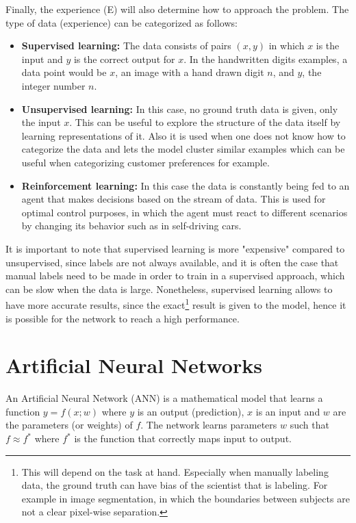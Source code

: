 Finally, the experience (E) will also determine how to approach the problem. The type of data (experience) can be categorized as follows:
\begin{itemize}
    \item \textbf{Supervised learning:} The data consists of pairs $(x,y)$ in which $x$ is the input and $y$ is the correct output for $x$. In the handwritten digits examples, a data point would be $x$, an image with a hand drawn digit $n$, and $y$, the integer number $n$.
    \item \textbf{Unsupervised learning:} In this case, no ground truth data is given, only the input $x$. This can be useful to explore the structure of the data itself by learning representations of it. Also it is used when one does not know how to categorize the data and lets the model cluster similar examples which can be useful when categorizing customer preferences for example.
    \item \textbf{Reinforcement learning:} In this case the data is constantly being fed to an agent that makes decisions based on the stream of data. This is used for optimal control purposes, in which the agent must react to different scenarios by changing its behavior such as in self-driving cars.
\end{itemize}

It is important to note that supervised learning is more "expensive" compared to unsupervised, since labels are not always available, and it is often the case that manual labels need to be made in order to train in a supervised approach, which can be slow when the data is large. Nonetheless, supervised learning allows to have more accurate results, since the exact\footnote{This will depend on the task at hand. Especially when manually labeling data, the ground truth can have bias of the scientist that is labeling. For example in image segmentation, in which the boundaries between subjects are not a clear pixel-wise separation.} result is given to the model, hence it is possible for the network to reach a high performance.

\section{Artificial Neural Networks}

An Artificial Neural Network (ANN) is a mathematical model that learns a function $y = f(x;w)$ where $y$ is an output (prediction), $x$ is an input and $w$ are the parameters (or weights) of $f$. The network learns parameters $w$ such that $f\approx f^*$ where $f^*$ is the function that correctly maps input to output.

